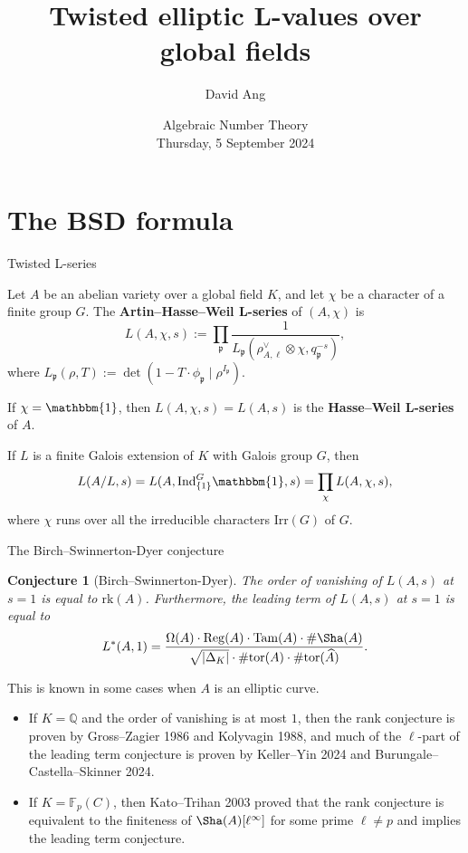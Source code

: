\documentclass[10pt]{beamer}
\title{Twisted elliptic L-values over global fields}
\author[David Ang]{David Ang}
\institute[LSGNT]{London School of Geometry and Number Theory}
\date{\small Algebraic Number Theory \\ \vspace{0.5cm} \footnotesize Thursday, 5 September 2024}
\newtheorem{conjecture}{Conjecture}
\begin{document}
\frame{\titlepage}

\section{The BSD formula}

\begin{frame}[t]{Twisted L-series}

Let $ A $ be an abelian variety over a global field $ K $, and let $ \chi $ be a character of a finite group $ G $. \pause The \textbf{Artin--Hasse--Weil L-series} of $ (A, \chi) $ is
$$ L(A, \chi, s) := \prod_\mathfrak{p} \dfrac{1}{L_\mathfrak{p}(\rho_{A, \ell}^\vee \otimes \chi, q_\mathfrak{p}^{-s})}, $$
where $ L_\mathfrak{p}(\rho, T) := \det(1 - T \cdot \phi_\mathfrak{p} \mid \rho^{I_\mathfrak{p}}) $.

\pause

\vspace{0.5cm} If $ \chi = \mathbbm{1} $, then $ L(A, \chi, s) = L(A, s) $ is the \textbf{Hasse--Weil L-series} of $ A $.

\pause

\vspace{0.5cm} If $ L $ is a finite Galois extension of $ K $ with Galois group $ G $, then
$$ L(A / L, s) = L(A, \mathrm{Ind}_{\{1\}}^G \mathbbm{1}, s) = \prod_\chi L(A, \chi, s), $$
where $ \chi $ runs over all the irreducible characters $ \mathrm{Irr}(G) $ of $ G $.

\end{frame}

\begin{frame}[t]{The Birch--Swinnerton-Dyer conjecture}

\begin{conjecture}[Birch--Swinnerton-Dyer]
The order of vanishing of $ L(A, s) $ at $ s = 1 $ is equal to $ \mathrm{rk}(A) $. Furthermore, the leading term of $ L(A, s) $ at $ s = 1 $ is equal to
$$ L^*(A, 1) = \dfrac{\Omega(A) \cdot \mathrm{Reg}(A) \cdot \mathrm{Tam}(A) \cdot \#\Sha(A)}{\sqrt{|\Delta_K|} \cdot \#\mathrm{tor}(A) \cdot \#\mathrm{tor}(\widehat{A})}. $$
\end{conjecture}

\pause

This is known in some cases when $ A $ is an elliptic curve.

\begin{itemize}
\item If $ K = \mathbb{Q} $ and the order of vanishing is at most $ 1 $, then the rank conjecture is proven by Gross--Zagier 1986 and Kolyvagin 1988, and much of the $ \ell $-part of the leading term conjecture is proven by Keller--Yin 2024 and Burungale--Castella--Skinner 2024.
\item If $ K = \mathbb{F}_p(C) $, then Kato--Trihan 2003 proved that the rank conjecture is equivalent to the finiteness of $ \Sha(A)[\ell^\infty] $ for some prime $ \ell \ne p $ and implies the leading term conjecture.
\end{itemize}

\end{frame}
\end{document}
